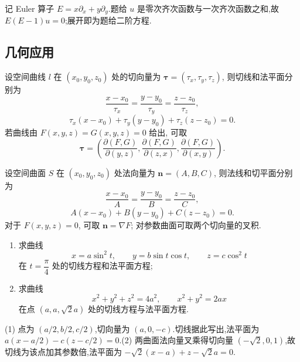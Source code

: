 \begin{solution}
    记 Euler 算子 $E=x\partial_x+y\partial_y$.题给 $u$ 是零次齐次函数与一次齐次函数之和,故 $E(E-1)u=0$;展开即为题给二阶方程.
\end{solution}



\subsection{几何应用}

\begin{proposition}[\markstar]
    设空间曲线 $l$ 在 $(x_0,y_0,z_0)$ 处的切向量为 $\bm\tau=(\tau_x,\tau_y,\tau_z)$, 则切线和法平面分别为
    \[
        \dfrac{x-x_0}{\tau_x}=\dfrac{y-y_0}{\tau_y}=\dfrac{z-z_0}{\tau_z},
    \]
    \[
        \tau_x(x-x_0)+\tau_y(y-y_0)+\tau_z(z-z_0)=0.
    \]
    若曲线由 $F(x,y,z)=G(x,y,z)=0$ 给出, 可取
    \[
        \bm\tau=
        \left(
        \dfrac{\partial(F,G)}{\partial(y,z)},
        \dfrac{\partial(F,G)}{\partial(z,x)},
        \dfrac{\partial(F,G)}{\partial(x,y)}
        \right).
    \]
\end{proposition}

\begin{proposition}[\markstar]
    设空间曲面 $S$ 在 $(x_0,y_0,z_0)$ 处法向量为 $\bm n=(A,B,C)$, 则法线和切平面分别为
    \[
        \dfrac{x-x_0}{A}=\dfrac{y-y_0}{B}=\dfrac{z-z_0}{C},
    \]
    \[
        A(x-x_0)+B(y-y_0)+C(z-z_0)=0.
    \]
    对于 $F(x,y,z)=0$, 可取 $\bm n=\nabla F$; 对参数曲面可取两个切向量的叉积.
\end{proposition}

\begin{example}
    \begin{enumerate}
        \item 求曲线
              \[
                  x=a\sin^2t,\qquad y=b\sin t\cos t,\qquad z=c\cos^2t
              \]
              在 $t=\dfrac{\pi}{4}$ 处的切线方程和法平面方程;
        \item 求曲线
              \[
                  x^2+y^2+z^2=4a^2,\qquad x^2+y^2=2ax
              \]
              在点 $(a,a,\sqrt2a)$ 处的切线方程与法平面方程.
    \end{enumerate}
\end{example}
\exampleblank

\begin{solution}

    (1) 点为 $(a/2,b/2,c/2)$,切向量为 $(a,0,-c)$.切线据此写出,法平面为 $a(x-a/2)-c(z-c/2)=0$.(2) 两曲面法向量叉乘得切向量 $(-\sqrt{2},0,1)$,故切线为该点加其参数倍,法平面为 $-\sqrt{2}(x-a)+z-\sqrt{2}a=0$.
\end{solution}

